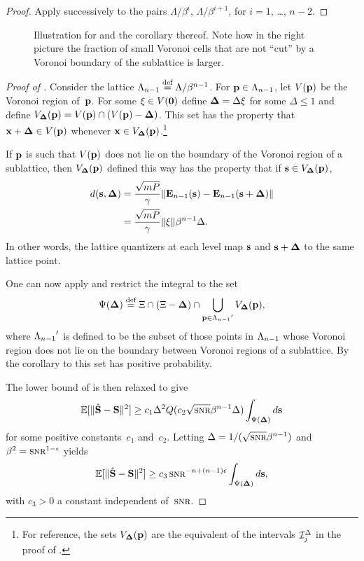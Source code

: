 \begin{subappendices}
  \begin{proof}
    Apply  successively to the pairs $\Lambda/\beta^i$,
    $\Lambda/\beta^{i+1}$, for $i = 1$, \dots, $n-2$.
  \end{proof}

  \begin{figure}
    \centerline{
    \subfloat[$\beta = 3$]{}
    \hfil
    \subfloat[$\beta = 4$]{}
    }
    \caption{Illustration for  and the corollary thereof.
    Note how in the right picture the fraction of small Voronoi cells that are
    not ``cut'' by a Voronoi boundary of the sublattice is larger.}
    \label{fig:voronoiintersect}
  \end{figure}

  \begin{proof}[Proof of ]
    Consider the lattice ${\Lambda_{n-1}} \stackrel{\text{def}}{=} \Lambda/\beta^{n-1}$. For $\mathbf{p} \in
    {\Lambda_{n-1}}$, let $V(\mathbf{p})$ be the Voronoi region of~$\mathbf{p}$.
    For some $\mathbf{\xi} \in V(\mathbf{0})$ define $\mathbf{\Delta} = \Delta \mathbf{\xi}$ for some $\Delta \le
    1$ and define ${V_{\mathbf{\Delta}}}(\mathbf{p}) = V(\mathbf{p}) \cap (V(\mathbf{p}) - \mathbf{\Delta})$. This set has the
    property that $\mathbf{x} + \mathbf{\Delta} \in V(\mathbf{p})$ whenever $\mathbf{x} \in {V_{\mathbf{\Delta}}}(\mathbf{p})$.\footnote{For
    reference, the sets ${V_{\mathbf{\Delta}}}(\mathbf{p})$ are the equivalent of the intervals
    $\mathcal{I}_j^{\Delta}$ in the proof of .}

    If $\mathbf{p}$ is such that $V(\mathbf{p})$ does not lie on the boundary of the Voronoi
    region of a sublattice, then ${V_{\mathbf{\Delta}}}(\mathbf{p})$ defined this way has the property
    that if $\mathbf{s} \in {V_{\mathbf{\Delta}}}(\mathbf{p})$,
    \begin{align*}
      d(\mathbf{s},\mathbf{\Delta}) &= \frac{\sqrt{mP}}{\gamma} \| \mathbf{E}_{n-1}(\mathbf{s}) - \mathbf{E}_{n-1}(\mathbf{s} +
      \mathbf{\Delta}) \| \\
      &= \frac{\sqrt{mP}}{\gamma} \| \mathbf{\xi} \| \beta^{n-1} \Delta.
    \end{align*}
    In other words, the lattice quantizers at each level map $\mathbf{s}$ and $\mathbf{s} +
    \mathbf{\Delta}$ to the same lattice point.

    One can now apply  and restrict the integral to the set
    \[ \Psi(\mathbf{\Delta}) \stackrel{\text{def}}{=} \Xi \cap (\Xi - \mathbf{\Delta}) \cap \bigcup_{\mathbf{p} \in {\Lambda_{n-1}}'} {V_{\mathbf{\Delta}}}(\mathbf{p}),
    \]
    where ${\Lambda_{n-1}}'$ is defined to be the subset of those points in ${\Lambda_{n-1}}$ whose
    Voronoi region does not lie on the boundary between Voronoi regions of a
    sublattice. By the corollary to  this set has positive
    probability.

    The lower bound of  is then relaxed to give
    \begin{equation*}
      \msev \ge c_1 \Delta^2 Q(c_2 \sqrt{\snr} \beta^{n-1} \Delta) 
      \int_{\Psi(\Dv)} d\s
    \end{equation*}
    for some positive constants~$c_1$ and~$c_2$. Letting $\Delta =
    1/(\sqrt{\snr} \beta^{n-1})$ and $\beta^2 = \snr^{1-\e}$ yields
    \begin{equation*}
      \msev \ge c_3 \snr^{-n+(n-1)\e} \int_{\Psi(\Dv)} d\s,
    \end{equation*}
    with $c_3 > 0$ a constant independent of~$\snr$.


\end{proof}
\end{subappendices}
